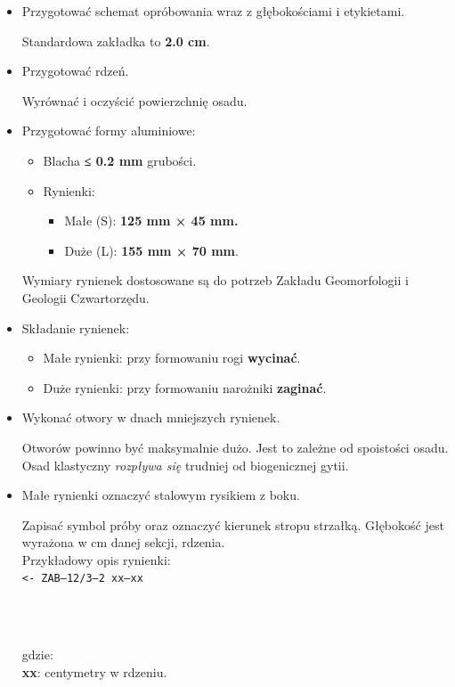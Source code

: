 \documentclass[
  letterpaper,
  DIV=11,
  numbers=noendperiod]{scrreprt}
\begin{document}
\begin{itemize}
\item
  Przygotować schemat opróbowania wraz z głębokościami i etykietami.

  Standardowa zakładka to \textbf{2.0 cm}.
\item
  Przygotować rdzeń.

  Wyrównać i oczyścić powierzchnię osadu.
\item
  Przygotować formy aluminiowe:

  \begin{itemize}
  \item
    Blacha \textbf{≤ 0.2 mm} grubości.
  \item
    Rynienki:

    \begin{itemize}
    \item
      Małe (S): \textbf{125 mm × 45 mm.}
    \item
      Duże (L): \textbf{155 mm × 70 mm}.
    \end{itemize}
  \end{itemize}

  Wymiary rynienek dostosowane są do potrzeb Zakładu Geomorfologii i
  Geologii Czwartorzędu.
\item
  Składanie rynienek:

  \begin{itemize}
  \item
    Małe rynienki: przy formowaniu rogi \textbf{wycinać}.
  \item
    Duże rynienki: przy formowaniu narożniki \textbf{zaginać}.
  \end{itemize}
\item
  Wykonać otwory w dnach mniejszych rynienek.

  Otworów powinno być maksymalnie dużo. Jest to zależne od spoistości
  osadu. Osad klastyczny \emph{rozpływa się} trudniej od biogenicznej
  gytii.
\item
  Małe rynienki oznaczyć stalowym rysikiem z boku.

  Zapisać symbol próby oraz oznaczyć kierunek stropu strzałką. Głębokość
  jest wyrażona w cm danej sekcji, rdzenia.\\
  Przykładowy opis rynienki:\\
  \texttt{\textless{}-\ ZAB–12/3–2\ xx–xx}\strut \\
  \strut \\
  gdzie:\\
  \textbf{xx}: centymetry w rdzeniu.
\end{itemize}
\end{document}
